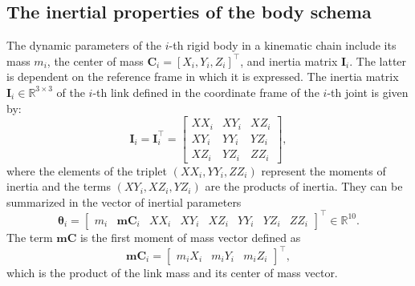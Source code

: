 \subsection{The inertial properties of the body schema}
The dynamic parameters of the $i$-th rigid body in a kinematic chain include its mass $m_i$, the center of mass $\bm{C}_i= \left[X_i, Y_i, Z_i\right]^\intercal$, and inertia matrix $\bm{I}_i$. The latter is dependent on the reference frame in which it is expressed. The inertia matrix $\bm{I}_i \in \mathbb{R}^{3\times 3}$ of the $i$-th link defined in the coordinate frame of the $i$-th joint is given by:
\begin{equation}
	\bm{I}_i= \bm{I}^\intercal_i= \begin{bmatrix}
		XX_i & XY_i & XZ_i\\
		XY_i & YY_i & YZ_i\\
		XZ_i & YZ_i & ZZ_i
	\end{bmatrix},
\end{equation}
where the elements of the triplet $(XX_i,YY_i,ZZ_i)$ represent the moments of inertia and the terms $(XY_i,XZ_i,YZ_i)$ are the products of inertia. They can be summarized in the vector of inertial parameters
\begin{equation}
	\bm{\theta}_i = \begin{bmatrix}	m_i & \bm{mC}_i &XX_i&XY_i&XZ_i&YY_i&YZ_i&ZZ_i \end{bmatrix}^\intercal \in \mathbb{R}^{10}.
\end{equation}
The term $\bm{mC}$ is the first moment of mass vector defined as
\begin{equation}
	\bm{mC}_i= \begin{bmatrix}
		m_iX_i & m_iY_i & m_iZ_i
	\end{bmatrix}^\intercal,
\end{equation}
which is the product of the link mass and its center of mass vector.

